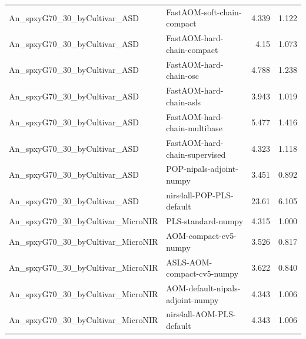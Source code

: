 \begin{landscape}
\begin{longtable}{L{8.0cm}L{9.5cm}rr}
An\_\allowbreak{}spxyG70\_\allowbreak{}30\_\allowbreak{}byCultivar\_\allowbreak{}ASD & FastAOM-\allowbreak{}soft-\allowbreak{}chain-\allowbreak{}compact & 4.339 & 1.122 \\
An\_\allowbreak{}spxyG70\_\allowbreak{}30\_\allowbreak{}byCultivar\_\allowbreak{}ASD & FastAOM-\allowbreak{}hard-\allowbreak{}chain-\allowbreak{}compact & 4.15 & 1.073 \\
An\_\allowbreak{}spxyG70\_\allowbreak{}30\_\allowbreak{}byCultivar\_\allowbreak{}ASD & FastAOM-\allowbreak{}hard-\allowbreak{}chain-\allowbreak{}osc & 4.788 & 1.238 \\
An\_\allowbreak{}spxyG70\_\allowbreak{}30\_\allowbreak{}byCultivar\_\allowbreak{}ASD & FastAOM-\allowbreak{}hard-\allowbreak{}chain-\allowbreak{}asls & 3.943 & 1.019 \\
An\_\allowbreak{}spxyG70\_\allowbreak{}30\_\allowbreak{}byCultivar\_\allowbreak{}ASD & FastAOM-\allowbreak{}hard-\allowbreak{}chain-\allowbreak{}multibase & 5.477 & 1.416 \\
An\_\allowbreak{}spxyG70\_\allowbreak{}30\_\allowbreak{}byCultivar\_\allowbreak{}ASD & FastAOM-\allowbreak{}hard-\allowbreak{}chain-\allowbreak{}supervised & 4.323 & 1.118 \\
An\_\allowbreak{}spxyG70\_\allowbreak{}30\_\allowbreak{}byCultivar\_\allowbreak{}ASD & POP-\allowbreak{}nipals-\allowbreak{}adjoint-\allowbreak{}numpy & 3.451 & 0.892 \\
An\_\allowbreak{}spxyG70\_\allowbreak{}30\_\allowbreak{}byCultivar\_\allowbreak{}ASD & nirs4all-\allowbreak{}POP-\allowbreak{}PLS-\allowbreak{}default & 23.61 & 6.105 \\
An\_\allowbreak{}spxyG70\_\allowbreak{}30\_\allowbreak{}byCultivar\_\allowbreak{}MicroNIR & PLS-\allowbreak{}standard-\allowbreak{}numpy & 4.315 & 1.000 \\
An\_\allowbreak{}spxyG70\_\allowbreak{}30\_\allowbreak{}byCultivar\_\allowbreak{}MicroNIR & AOM-\allowbreak{}compact-\allowbreak{}cv5-\allowbreak{}numpy & 3.526 & 0.817 \\
An\_\allowbreak{}spxyG70\_\allowbreak{}30\_\allowbreak{}byCultivar\_\allowbreak{}MicroNIR & ASLS-\allowbreak{}AOM-\allowbreak{}compact-\allowbreak{}cv5-\allowbreak{}numpy & 3.622 & 0.840 \\
An\_\allowbreak{}spxyG70\_\allowbreak{}30\_\allowbreak{}byCultivar\_\allowbreak{}MicroNIR & AOM-\allowbreak{}default-\allowbreak{}nipals-\allowbreak{}adjoint-\allowbreak{}numpy & 4.343 & 1.006 \\
An\_\allowbreak{}spxyG70\_\allowbreak{}30\_\allowbreak{}byCultivar\_\allowbreak{}MicroNIR & nirs4all-\allowbreak{}AOM-\allowbreak{}PLS-\allowbreak{}default & 4.343 & 1.006 \\

\end{longtable}
\end{landscape}
